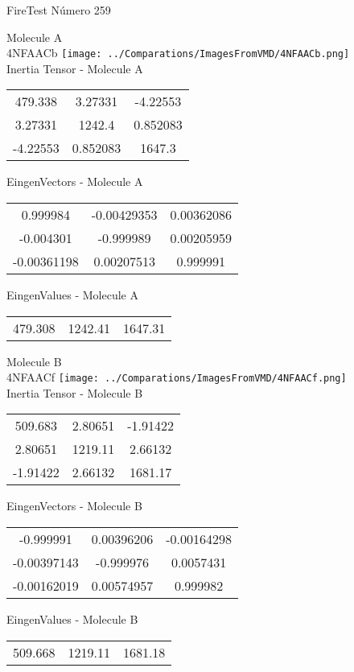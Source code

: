 \vtab[-2cm]
\begin{center}
{\large FireTest \tab Número 259}
\end{center}
\begin{multicols}{2}
\begin{center}

Molecule A \\ 
4NFAACb
\texttt{[image: ../Comparations/ImagesFromVMD/4NFAACb.png]}
\\
Inertia Tensor - Molecule A \\
\vtab

\begin{tabular}{|c c c|}
479.338	 & 	3.27331	 & 	-4.22553	 \\
3.27331	 & 	1242.4	 & 	0.852083	 \\
-4.22553	 & 	0.852083	 & 	1647.3
\end{tabular}

\vtab
 EingenVectors - Molecule A     \\
\vtab
\begin{tabular}{|c c c|}
0.999984	 & 	-0.00429353	 & 	0.00362086	 \\
-0.004301	 & 	-0.999989	 & 	0.00205959	 \\
-0.00361198	 & 	0.00207513	 & 	0.999991
\end{tabular}

\vtab
 EingenValues - Molecule A     \\
\vtab
\begin{tabular}{|c c c|}
479.308	 & 	1242.41	 & 	1647.31	 \\
\end{tabular}
\columnbreak

Molecule B \\ 
4NFAACf
\texttt{[image: ../Comparations/ImagesFromVMD/4NFAACf.png]}
\\
Inertia Tensor - Molecule B \\
\vtab

\begin{tabular}{|c c c|}
509.683	 & 	2.80651	 & 	-1.91422	 \\
2.80651	 & 	1219.11	 & 	2.66132	 \\
-1.91422	 & 	2.66132	 & 	1681.17
\end{tabular}

\vtab
 EingenVectors - Molecule B     \\
\vtab
\begin{tabular}{|c c c|}
-0.999991	 & 	0.00396206	 & 	-0.00164298	 \\
-0.00397143	 & 	-0.999976	 & 	0.0057431	 \\
-0.00162019	 & 	0.00574957	 & 	0.999982
\end{tabular}

\vtab
 EingenValues - Molecule B     \\
\vtab
\begin{tabular}{|c c c|}
509.668	 & 	1219.11	 & 	1681.18	 \\
\end{tabular}

\end{center}
\end{multicols}
